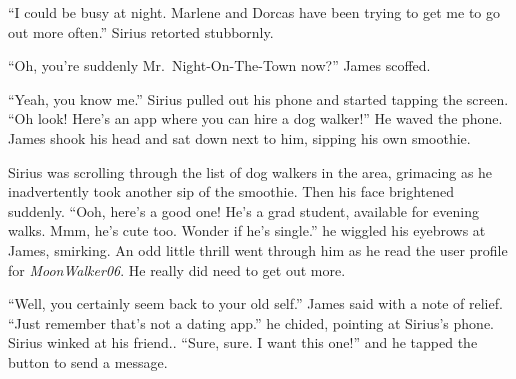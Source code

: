 \documentclass[12pt,twoside,openright]{memoir}
\begin{document}
``I could be busy at night. Marlene and Dorcas have been trying to get me to go out more often.'' Sirius retorted stubbornly.

``Oh, you're suddenly Mr.\ Night-On-The-Town now?'' James scoffed.

``Yeah, you know me.'' Sirius pulled out his phone and started tapping the screen. ``Oh look! Here's an app where you can hire a dog walker!'' He waved the phone. James shook his head and sat down next to him, sipping his own smoothie.

Sirius was scrolling through the list of dog walkers in the area, grimacing as he inadvertently took another sip of the smoothie. Then his face brightened suddenly. ``Ooh, here's a good one! He's a grad student, available for evening walks. Mmm, he's cute too. Wonder if he's single.'' he wiggled his eyebrows at James, smirking. An odd little thrill went through him as he read the user profile for \textit{MoonWalker06}. He really did need to get out more.

``Well, you certainly seem back to your old self.'' James said with a note of relief. ``Just remember that's not a dating app.'' he chided, pointing at Sirius's phone.\newline
Sirius winked at his friend.. ``Sure, sure. I want this one!'' and he tapped the button to send a message.
\end{document}
